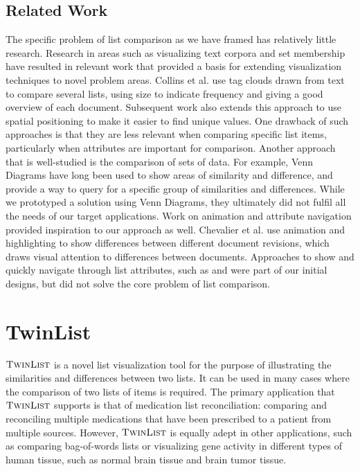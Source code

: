 \documentclass{chi2009}
\newcommand{\TwinList}{\textsc{TwinList}}
\begin{document}
\subsection{Related Work}
The specific problem of list comparison as we have framed has relatively little research. Research in areas such as visualizing text corpora and set membership have resulted in relevant work that provided a basis for extending visualization techniques to novel problem areas.  Collins et al.\cite{collins2009parallel} use tag clouds drawn from text to compare several lists, using size to indicate frequency and giving a good overview of each document. Subsequent work also extends this approach to use spatial positioning to make it easier to find unique values\cite{conwaytuscon11}. One drawback of such approaches is that they are less relevant when comparing specific list items, particularly when attributes are important for comparison. Another approach that is well-studied is the comparison of sets of data. For example, Venn Diagrams have long been used to show areas of similarity and difference, and provide a way to query for a specific group of similarities and differences\cite{kestler2005generalized}. While we prototyped a solution using Venn Diagrams, they ultimately did not fulfil all the needs of our target applications. Work on animation and attribute navigation provided inspiration to our approach as well. Chevalier et al. \cite{diffmation10} use animation and highlighting to show differences between different document revisions, which draws visual attention to differences between documents. Approaches to show and quickly navigate through list attributes, such as \cite{Chimera:1992:VBI:142750.142817} and \cite{Masui98lensbar} were part of our initial designs, but did not solve the core problem of list comparison.




\section{TwinList}
$\TwinList$ is a novel list visualization tool for the purpose of illustrating the similarities and differences between two lists. It can be used in many cases where the comparison of two lists of items is required. The primary application that $\TwinList$ supports is that of medication list reconciliation: comparing and reconciling multiple medications that have been prescribed to a patient from multiple sources\cite{JCAHO-2006}. However, $\TwinList$ is equally adept in other applications, such as comparing bag-of-words lists or visualizing gene activity in different types of human tissue, such as normal brain tissue and brain tumor tissue.
\end{document}
